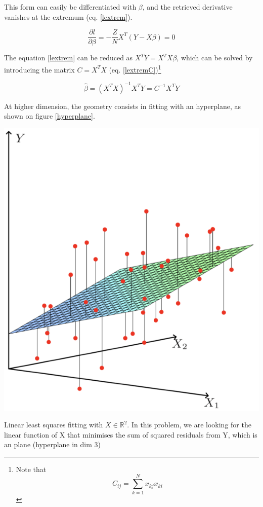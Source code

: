 \documentclass[a4paper]{tufte-book}
\begin{document}
This form can easily be differentiated with $\beta$, and the retrieved derivative
vanishes at the extremum (eq. \ref{lextrem}).

\begin{equation}
    \frac{\partial l}{\partial \beta} =  -\frac{Z}{N} X^T(Y-X\beta) =0
    \label{lextrem}
\end{equation}

The equation \ref{lextrem} can be reduced as $X^TY = X^TX\beta$, which can be
solved by introducing the matrix $C = X^TX$ (eq. \ref{lextremC})\footnote{Note
    that 
\begin{equation*}
C_{ij} = \sum_{k=1}^N x_{kj} x_{ki}
\end{equation*}}

\begin{equation}
    \hat{\beta} = (X^TX)^{-1} X^TY = C^{-1} X^TY
    \label{lextremC}
\end{equation}

At higher dimension, the geometry consists in fitting with an hyperplane, as
shown on figure \ref{hyperplane}.

\begin{marginfigure}
    \includegraphics{./Figures/hyperplane.png}
    \caption{Linear least squares fitting with $X\in\mathbb{R}^2$. In this
        problem, we are looking for the linear function of X that minimises the
    sum of squared residuals from Y, which is an plane (hyperplane in dim 3)}
    \label{hyperplane}
\end{marginfigure}
\end{document}
